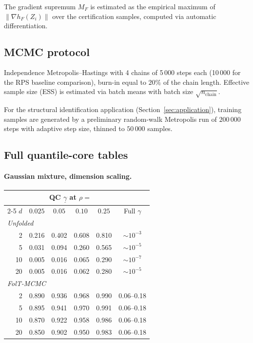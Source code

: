 The gradient supremum $M_F$ is estimated as the empirical maximum
of $\|\nabla h_F(Z_i)\|$ over the certification samples, computed
via automatic differentiation.

\subsection{MCMC protocol}
\label{app:mcmc_protocol}

Independence Metropolis--Hastings with 4 chains of 5\,000 steps
each (10\,000 for the RPS baseline comparison), burn-in equal to
$20\%$ of the chain length.  Effective sample size (ESS) is
estimated via batch means with batch size $\sqrt{n_{\mathrm{chain}}}$.

For the structural identification application
(Section~\ref{sec:application}), training samples are generated
by a preliminary random-walk Metropolis run of $200\,000$ steps
with adaptive step size, thinned to $50\,000$ samples.

\subsection{Full quantile-core tables}
\label{app:qc_tables}

\paragraph{Gaussian mixture, dimension scaling.}

\begin{center}
\begin{tabular}{rccccc}
\hline
& \multicolumn{4}{c}{QC $\underline{\gamma}$ at $\rho =$} \\
\cline{2-5}
$d$ & $0.025$ & $0.05$ & $0.10$ & $0.25$ & Full $\gamma$ \\
\hline
\multicolumn{6}{l}{\textit{Unfolded}} \\
2  & 0.216 & 0.402 & 0.608 & 0.810 & $\sim10^{-3}$ \\
5  & 0.031 & 0.094 & 0.260 & 0.565 & $\sim10^{-5}$ \\
10 & 0.005 & 0.016 & 0.065 & 0.290 & $\sim10^{-7}$ \\
20 & 0.005 & 0.016 & 0.062 & 0.280 & $\sim10^{-5}$ \\
\hline
\multicolumn{6}{l}{\textit{FolT-MCMC}} \\
2  & 0.890 & 0.936 & 0.968 & 0.990 & 0.06--0.18 \\
5  & 0.895 & 0.941 & 0.970 & 0.991 & 0.06--0.18 \\
10 & 0.870 & 0.922 & 0.958 & 0.986 & 0.06--0.18 \\
20 & 0.850 & 0.902 & 0.950 & 0.983 & 0.06--0.18 \\
\hline
\end{tabular}
\end{center}

